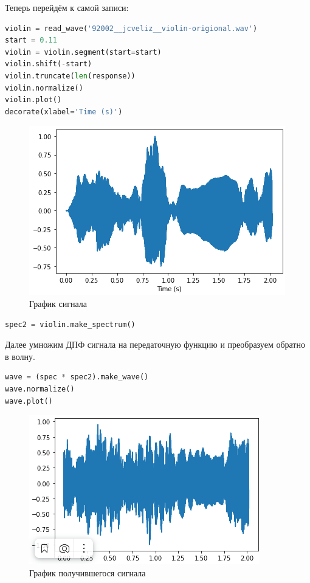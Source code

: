 Теперь перейдём к самой записи:

\begin{lstlisting}[language=Python]
violin = read_wave('92002__jcveliz__violin-origional.wav')
start = 0.11
violin = violin.segment(start=start)
violin.shift(-start)
violin.truncate(len(response))
violin.normalize()
violin.plot()
decorate(xlabel='Time (s)')
\end{lstlisting}
\begin{figure}[H]
	\begin{center}
		\includegraphics[scale=1]{fig/lab10/lab10_3.png}
		\caption{График сигнала}
	\end{center}
\end{figure}

\begin{lstlisting}[language=Python]
spec2 = violin.make_spectrum()
\end{lstlisting}

Далее умножим ДПФ сигнала на передаточную функцию и преобразуем обратно в волну.

\begin{lstlisting}[language=Python]
wave = (spec * spec2).make_wave()
wave.normalize()
wave.plot()
\end{lstlisting}
\begin{figure}[H]
	\begin{center}
		\includegraphics[scale=1]{fig/lab10/lab10_4.png}
		\caption{График получившегося сигнала}
	\end{center}
\end{figure}

